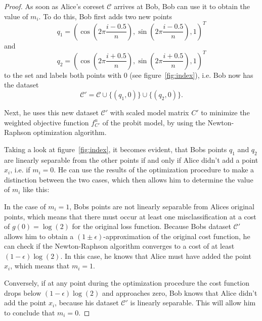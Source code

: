 \begin{proof}
    As soon as Alice's coreset $\mathcal{C}$ arrives at Bob,
    Bob can use it to obtain the value of $m_i$.
    To do this, Bob first adds two new points
    \begin{equation*}
        q_1 = \left( \cos{\left(2 \pi \frac{i - 0.5}{n}\right)},
        \sin{\left(2 \pi \frac{i - 0.5}{n}\right)}, 1 \right)^T
    \end{equation*}
    and
    \begin{equation*}
        q_2 = \left( \cos{\left(2 \pi \frac{i + 0.5}{n}\right)},
        \sin{\left(2 \pi \frac{i + 0.5}{n}\right)}, 1 \right)^T
    \end{equation*}
    to the set and labels both points with $0$ (see figure~\ref{fig:index}),
    i.e. Bob now has the dataset
    \begin{equation*}
        \mathcal{C}' = \mathcal{C} \cup \{(q_1, 0)\} \cup \{(q_2, 0)\}.
    \end{equation*}

    Next, he uses this new dataset $\mathcal{C}'$ with
    scaled model matrix $C'$ to
    minimize the weighted objective function
    $f_{C'}^u$ of the probit model,
    by using the Newton-Raphson optimization algorithm.

    Taking a look at figure~\ref{fig:index}, it becomes evident,
    that Bobs points $q_1$ and $q_2$ are linearly separable from
    the other points if and only if Alice didn't add a point
    $x_i$, i.e. if $m_i = 0$.
    He can use the results of the optimization procedure to
    make a distinction between the two cases,
    which then allows him to determine the value of $m_i$
    like this:

    In the case of $m_i=1$, Bobs points are not linearly separable from
    Alices original points, which means that there must occur at least one
    misclassification at a cost of $g(0) = \log(2)$ for the original
    loss function.
    Because Bobs dataset $\mathcal{C}'$ allows him to obtain a
    $(1 \pm \epsilon)$-approximation of the original cost function, he can
    check if the Newton-Raphson algorithm converges to
    a cost of at least $(1 - \epsilon) \log(2)$.
    In this case, he knows that Alice must have added the point $x_i$,
    which means that $m_i=1$.

    Conversely, if at any point during the optimization procedure
    the cost function drops below
    $(1 - \epsilon) \log(2)$
    and approaches zero, Bob knows that Alice didn't add the point
    $x_i$, because his dataset $\mathcal{C}'$ is linearly separable.
    This will allow him to conclude that $m_i = 0$.


\end{proof}
